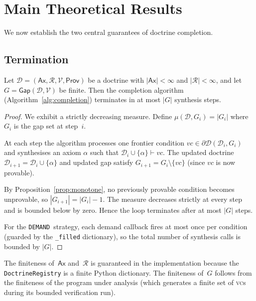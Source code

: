 \documentclass[11pt]{article}
\newcommand{\Doct}{\mathcal{D}}           %
\newcommand{\DoctF}{\partial\Doct}        %
\newcommand{\Ax}{\mathsf{Ax}}             %
\newcommand{\Rules}{\mathcal{R}}          %
\newcommand{\Prov}{\mathsf{Prov}}         %
\newcommand{\Gap}{\mathsf{Gap}}           %
\newcommand{\VC}{\mathit{vc}}             %
\newcommand{\VCset}{\mathcal{V}}          %
\newcommand{\DEMAND}{\texttt{DEMAND}}
\begin{document}
\section{Main Theoretical Results}\label{sec:main}

We now establish the two central guarantees of doctrine completion.

\subsection{Termination}

\begin{theorem}\label{thm:termination}
Let $\Doct = (\Ax, \Rules, \VCset, \Prov)$ be a doctrine with
$|\Ax| < \infty$ and $|\Rules| < \infty$, and let
$G = \Gap(\Doct, \VCset)$ be finite.  Then the
completion algorithm (Algorithm~\ref{alg:completion}) terminates
in at most $|G|$ synthesis steps.
\end{theorem}
\begin{proof}
We exhibit a strictly decreasing measure.  Define
$\mu(\Doct, G_i) = |G_i|$ where $G_i$ is the gap set at step~$i$.

At each step the algorithm processes one frontier condition
$\VC \in \DoctF(\Doct_i, G_i)$ and synthesises an axiom $\alpha$
such that $\Doct_i \cup \{\alpha\} \vdash \VC$.  The updated doctrine
$\Doct_{i+1} = \Doct_i \cup \{\alpha\}$ and updated gap satisfy
$G_{i+1} = G_i \setminus \{\VC\}$ (since $\VC$ is now provable).

By Proposition~\ref{prop:monotone}, no previously provable condition
becomes unprovable, so $|G_{i+1}| = |G_i| - 1$.  The measure
decreases strictly at every step and is bounded below by zero.
Hence the loop terminates after at most $|G|$ steps.

For the \DEMAND\ strategy, each demand callback fires at most once
per condition (guarded by the \texttt{\_filled} dictionary), so
the total number of synthesis calls is bounded by $|G|$.
\end{proof}

\begin{remark}
The finiteness of~$\Ax$ and~$\Rules$ is guaranteed in the
implementation because the \texttt{DoctrineRegistry} is a finite
Python dictionary.  The finiteness of~$G$ follows from the finiteness
of the program under analysis (which generates a finite set of
\textsc{vc}s during its bounded verification run).
\end{remark}
\end{document}
